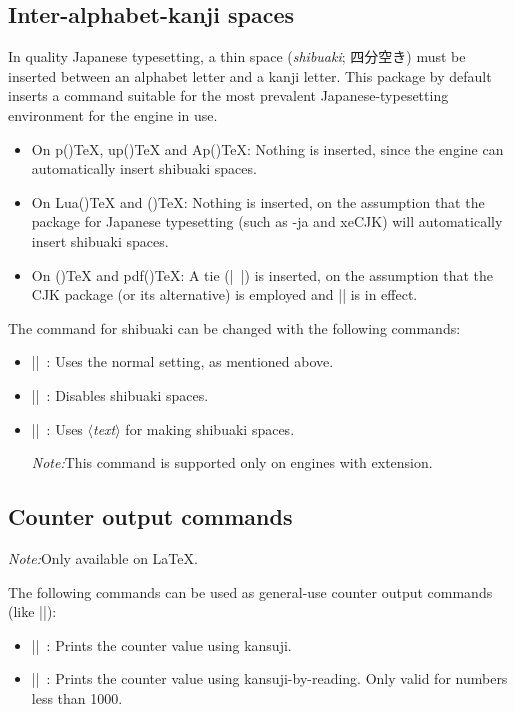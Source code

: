 \documentclass[a4paper]{article}
\newcommand{\Pkg}[1]{\textsf{#1}}
\newcommand{\Meta}[1]{$\langle$\textit{#1}$\rangle$}
\newcommand{\Note}{\par\noindent\emph{Note:}\quad}
\newcommand{\Means}{~:\quad}
\newcommand*{\Ja}[1]{{\fIpaex#1}}
\newcommand*{\+}{\hspace{0.25em minus 0.25em}}
\begin{document}
\subsection{Inter-alphabet-kanji spaces}

In quality Japanese typesetting, a thin space
(\emph{shibuaki}; \Ja{四分空き}) must be inserted
between an alphabet letter and a kanji letter.
This package by default inserts a command
suitable for the most prevalent Japanese-typesetting environment
for the engine in use.

\begin{itemize}
\item On p(\La){\TeX}, up(\La){\TeX} and Ap(\La){\TeX}:
  Nothing is inserted,
  since the engine can automatically insert shibuaki spaces.
\item On Lua(\La){\TeX} and (\La){\TeX}:
  Nothing is inserted,
  on the assumption that the package for Japanese typesetting
  (such as \Pkg{\LuaTeX-ja} and \Pkg{xeCJK})
  will automatically insert shibuaki spaces.
\item On (\La){\TeX} and pdf(\La){\TeX}:
  A tie (|~|) is inserted,
  on the assumption that the \Pkg{CJK} package
  (or its alternative)
  is employed and |\CJKtilde| is in effect.
\end{itemize}

The command for shibuaki can be changed with the following commands:
\begin{itemize}
\item |\WarekiUseNormalInterGlue|\Means
  Uses the normal setting, as mentioned above.
\item |\WarekiUseNoInterGlue|\Means
  Disables shibuaki spaces.
\item |\WarekiUseCustomInterGlue{|\Meta{text}|}|\Means
  Uses \Meta{text} for making shibuaki spaces.
  \Note This command is supported
  only on engines with {\eTeX} extension.
\end{itemize}

\subsection{Counter output commands}

\Note Only available on {\LaTeX}.

The following commands can be used
as general-use counter output commands
(like |\arabic|):
\begin{itemize}
\item |\WarekiKansuji{|\Meta{counter}|}|\Means
  Prints the counter value using kansuji.
\item |\WarekiJKansuji{|\Meta{counter}|}|\Means
  Prints the counter value using kansuji-by-reading.
  Only valid for numbers less than 1000.
\end{itemize}
\end{document}
